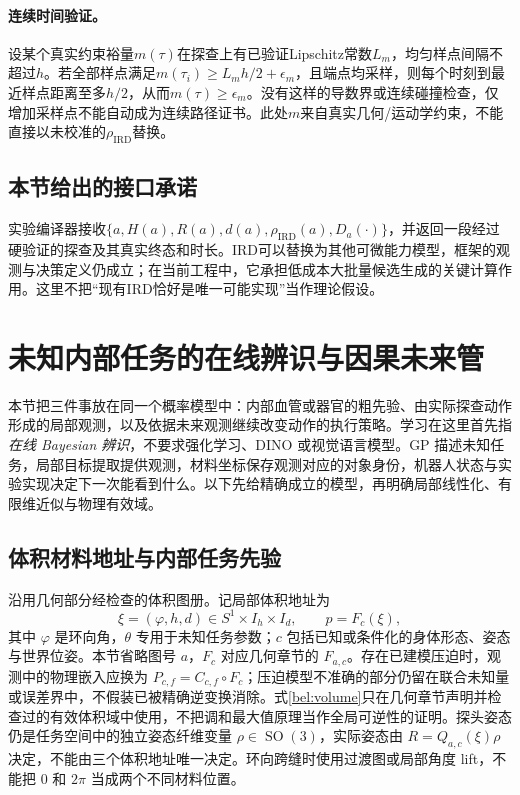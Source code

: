 \documentclass[11pt,a4paper]{article}
\numberwithin{equation}{section}
\theoremstyle{definition}
\DeclareMathOperator{\SO}{SO}
\begin{document}
\paragraph{连续时间验证。}
设某个真实约束裕量$m(\tau)$在探查上有已验证Lipschitz常数$L_m$，均匀样点间隔不超过$h$。若全部样点满足$m(\tau_i)\geq L_mh/2+\epsilon_m$，且端点均采样，则每个时刻到最近样点距离至多$h/2$，从而$m(\tau)\geq\epsilon_m$。没有这样的导数界或连续碰撞检查，仅增加采样点不能自动成为连续路径证书。此处$m$来自真实几何/运动学约束，不能直接以未校准的$\rho_{\mathrm{IRD}}$替换。

\subsection{本节给出的接口承诺}
实验编译器接收$\{a,H(a),R(a),d(a),\rho_{\mathrm{IRD}}(a),D_a(\cdot)\}$，并返回一段经过硬验证的探查及其真实终态和时长。IRD可以替换为其他可微能力模型，框架的观测与决策定义仍成立；在当前工程中，它承担低成本大批量候选生成的关键计算作用。这里不把“现有IRD恰好是唯一可能实现”当作理论假设。


\section{未知内部任务的在线辨识与因果未来管}
\label{bel:sec}

本节把三件事放在同一个概率模型中：内部血管或器官的粗先验、由实际探查动作形成的局部观测，以及依据未来观测继续改变动作的执行策略。学习在这里首先指\emph{在线 Bayesian 辨识}，不要求强化学习、DINO 或视觉语言模型。GP 描述未知任务，局部目标提取提供观测，材料坐标保存观测对应的对象身份，机器人状态与实验实现决定下一次能看到什么。以下先给精确成立的模型，再明确局部线性化、有限维近似与物理有效域。

\subsection{体积材料地址与内部任务先验}
\label{bel:prior}

沿用几何部分经检查的体积图册。记局部体积地址为
\begin{equation}
 \xi=(\varphi,h,d)\in S^1\times I_h\times I_d,
 \qquad p=F_c(\xi),
 \label{bel:volume}
\end{equation}
其中 $\varphi$ 是环向角，$\theta$ 专用于未知任务参数；$c$ 包括已知或条件化的身体形态、姿态与世界位姿。本节省略图号 $a$，$F_c$ 对应几何章节的 $F_{a,c}$。存在已建模压迫时，观测中的物理嵌入应换为 $P_{c,f}=C_{c,f}\circ F_c$；压迫模型不准确的部分仍留在联合未知量或误差界中，不假装已被精确逆变换消除。式\eqref{bel:volume}只在几何章节声明并检查过的有效体积域中使用，不把调和最大值原理当作全局可逆性的证明。探头姿态仍是任务空间中的独立姿态纤维变量 $\rho\in\SO(3)$，实际姿态由 $R=Q_{a,c}(\xi)\rho$ 决定，不能由三个体积地址唯一决定。环向跨缝时使用过渡图或局部角度 lift，不能把 $0$ 和 $2\pi$ 当成两个不同材料位置。
\end{document}
